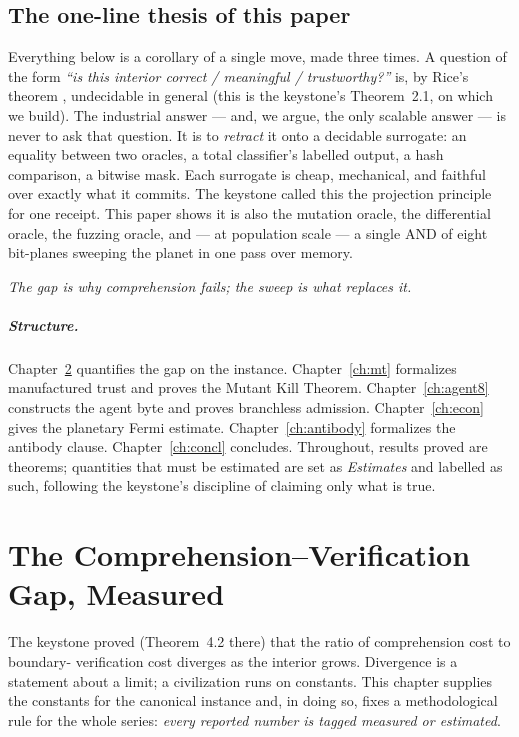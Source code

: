 \documentclass[11pt,oneside]{book}
\theoremstyle{definition}
\theoremstyle{plain}
\theoremstyle{remark}
\begin{document}
\section{The one-line thesis of this paper}

Everything below is a corollary of a single move, made three times. A question of the form
\emph{``is this interior correct / meaningful / trustworthy?''} is, by Rice's theorem
\cite{rice1953}, undecidable in general (this is the keystone's Theorem~2.1, on which we build).
The industrial answer --- and, we argue, the only scalable answer --- is never to ask that
question. It is to \emph{retract} it onto a decidable surrogate: an equality between two
oracles, a total classifier's labelled output, a hash comparison, a bitwise mask. Each surrogate
is cheap, mechanical, and faithful over exactly what it commits. The keystone called this the
projection principle for one receipt. This paper shows it is also the mutation oracle, the
differential oracle, the fuzzing oracle, and --- at population scale --- a single AND of eight
bit-planes sweeping the planet in one pass over memory.

\begin{center}\itshape
The gap is why comprehension fails; the sweep is what replaces it.
\end{center}

\paragraph{Structure.} Chapter~\ref{ch:gap} quantifies the gap on the instance.
Chapter~\ref{ch:mt} formalizes manufactured trust and proves the Mutant Kill Theorem.
Chapter~\ref{ch:agent8} constructs the agent byte and proves branchless admission.
Chapter~\ref{ch:econ} gives the planetary Fermi estimate. Chapter~\ref{ch:antibody} formalizes
the antibody clause. Chapter~\ref{ch:concl} concludes. Throughout, results proved are theorems;
quantities that must be estimated are set as \emph{Estimates} and labelled as such, following
the keystone's discipline of claiming only what is true.

\chapter{The Comprehension--Verification Gap, Measured}
\label{ch:gap}

The keystone proved (Theorem~4.2 there) that the ratio of comprehension cost to boundary-
verification cost diverges as the interior grows. Divergence is a statement about a limit; a
civilization runs on constants. This chapter supplies the constants for the canonical instance
and, in doing so, fixes a methodological rule for the whole series: \emph{every reported number
is tagged measured or estimated}.
\end{document}
